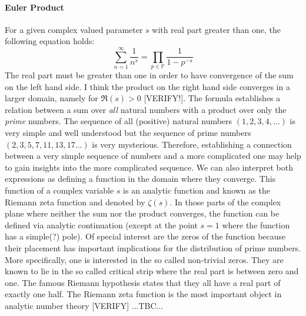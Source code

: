 

\paragraph{Euler Product}
For a given complex valued parameter $s$ with real part greater than one, the following equation holds:
\begin{equation}
\sum_{n=1}^{\infty} \frac{1}{n^s} = 
\prod_{p \in \mathbb{P}} \frac{1}{1 - p^{-s}}
\end{equation}
The real part must be greater than one in order to have convergence of the sum on the left hand side. I think the product on the right hand side converges in a larger domain, namely for $\Re(s) > 0$ [VERIFY!]. The formula establishes a relation between a sum over \emph{all} natural numbers with a product over only the \emph{prime} numbers. The sequence of all (positive) natural numbers $(1,2,3,4,\ldots)$ is very simple and well understood but the sequence of prime numbers $(2,3,5,7,11,13,17\ldots)$ is very mysterious. Therefore, establishing a connection between a very simple sequence of numbers and a more complicated one may help to gain insights into the more complicated sequence. We can also interpret both expressions as defining a function in the domain where they converge. This function of a complex variable $s$ is an analytic function and known as the Riemann zeta function and denoted by $\zeta(s)$. In those parts of the complex plane where neither the sum nor the product converges, the function can be defined via analytic continuation (except at the point $s=1$ where the function has a simple(?) pole). Of special interest are the zeros of the function because their placement has important implications for the distribution of prime numbers. More specifically, one is interested in the so called non-trivial zeros. They are known to lie in the so called critical strip where the real part is between zero and one. The famous Riemann hypothesis states that they all have a real part of exactly one half. The Riemann zeta function is the most important object in analytic number theory [VERIFY] ...TBC...


